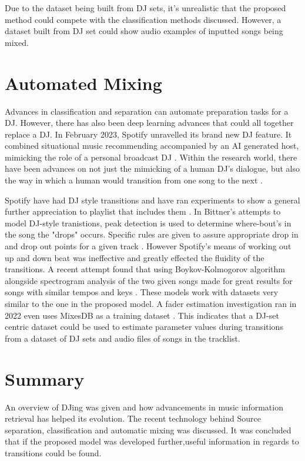 Due to the dataset being built from DJ sets, it's unrealistic that the proposed method could compete with the classification methods discussed. However, a dataset built from DJ set could show audio examples of inputted songs being mixed.

\section{Automated Mixing}
Advances in classification and separation can automate preparation tasks for a DJ. However, there has also been deep learning advances that could all together replace a DJ. In February 2023, Spotify unravelled its brand new DJ feature. It combined situational music recommending accompanied by an AI generated host, mimicking the role of a personal broadcast DJ \citep{naomi_spotify_2023}. Within the research world, there have been advances on not just the mimicking of a human DJ's dialogue, but also the way in which a human would transition from one song to the next \citep{chen_automatic_2022}.

Spotify have had DJ style transitions and have ran experiments to show a general further appreciation to playlist that includes them \citep{bittner_automatic_2017}. In Bittner's  attempts to model DJ-style tranistions, peak detection is used to determine where-bout's in the song the "drops" occurs. Specific rules are given to assure appropriate drop in and drop out points for a given track \citep{bittner_automatic_2017}.  However Spotify's means of working out up and down beat was ineffective and greatly effected the fluidity of the transitions. A recent attempt found that using Boykov-Kolmogorov algorithm alongside spectrogram analysis of the two given songs made for great results for songs with similar tempos and keys \citep{robinson_automated_2023}. These models work with datasets very similar to the one in the proposed model. A fader estimation investigation ran in 2022 even uses MixesDB as a training dataset \citep{kim_joint_2022}. This indicates that a DJ-set centric dataset could be used to estimate parameter values during transitions from a dataset of DJ sets and audio files of songs in the tracklist.

\section{Summary}
An overview of DJing was given and how advancements in music information retrieval has helped its evolution. The recent technology behind Source separation, classification and automatic mixing was discussed. It was concluded that if the proposed model was developed further,useful information in regards to transitions could be found.

